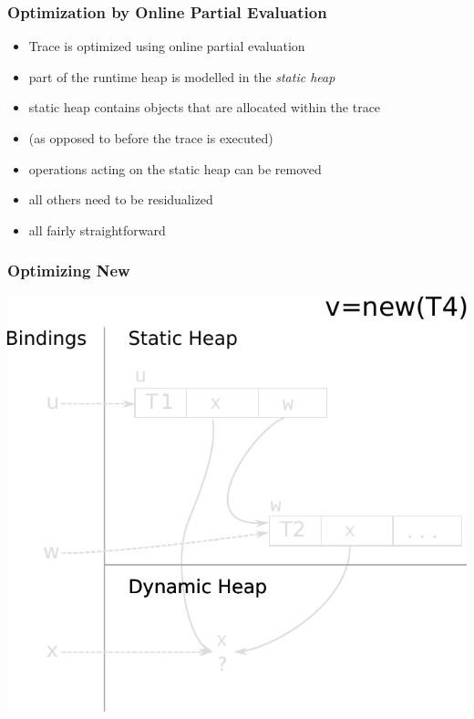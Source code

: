 \documentclass[utf8x]{beamer}
\begin{document}
\begin{frame}
  \frametitle{Optimization by Online Partial Evaluation}
  \begin{itemize}
      \item Trace is optimized using online partial evaluation
      \item part of the runtime heap is modelled in the \emph{static heap}
      \item static heap contains objects that are allocated within the trace
      \item (as opposed to before the trace is executed)
      \pause
      \item operations acting on the static heap can be removed
      \item all others need to be residualized
      \item all fairly straightforward
  \end{itemize}
\end{frame}


\begin{frame}[plain]
  \frametitle{Optimizing New}
  \includegraphics[scale=0.8]{figures/opt_new1}
\end{frame}
\end{document}
